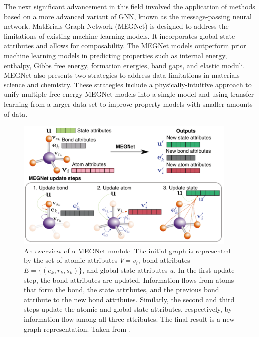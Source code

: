 




The next significant advancement in this field involved the application of methods based on a more advanced variant of GNN, known as the message-passing neural network. MatErials Graph Network (MEGNet) \cite{chen2019graph} is designed to address the limitations of existing machine learning models. It incorporates global state attributes and allows for composability.  The MEGNet models outperform prior machine learning models in predicting properties such as internal energy, enthalpy, Gibbs free energy, formation energies, band gaps, and elastic moduli. MEGNet also presents two strategies to address data limitations in materials science and chemistry. These strategies include a physically-intuitive approach to unify multiple free energy MEGNet models into a single model and using transfer learning from a larger data set to improve property models with smaller amounts of data. 

\begin{figure}[H]
    \noindent
    \centering
    \includegraphics[width=10.6cm]{figures/megnet.png}
    \caption{An overview of a MEGNet module. The initial graph is represented by the set of atomic attributes $V=v_i$, bond attributes $E =\{(e_k, r_k, s_k)\}$, and global state attributes $u$. In the first update step, the bond attributes are updated. Information flows from atoms that form the bond, the state attributes, and the previous bond attribute to the new bond attributes. Similarly, the second and third steps update the atomic and global state attributes, respectively, by information flow among all three attributes. The final result is a new graph representation. Taken from \cite{chen2019graph}.}
    \label{fig:megnet}
\end{figure}

